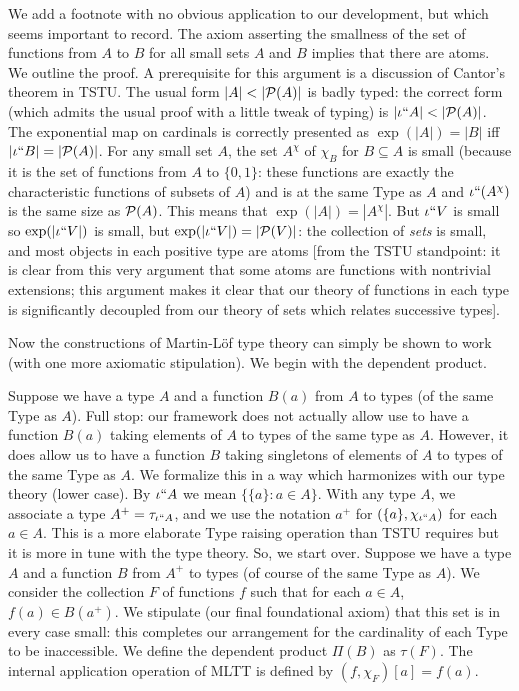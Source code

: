 \documentclass[12pt]{article}
\begin{document}
We add a footnote with no obvious application to our development, but which seems important to record.  The axiom asserting the smallness of the set of functions from $A$ to $B$ for all small sets $A$ and $B$ implies that there are atoms.  We outline the proof.   A prerequisite for this argument is a discussion of Cantor's theorem in TSTU.  The usual form $|A| < |{\cal P}(A)|$ is badly typed:  the correct form (which admits the usual proof with a little tweak of typing) is
$|\iota``A|<|{\cal P}(A)|$.  The exponential map on cardinals is correctly presented as $\exp(|A|)=|B|$ iff $|\iota``B|=|{\cal P}(A)|$.  For any small set $A$, the set $A^{\chi}$ of $\chi_B$ for $B\subseteq A$ is small (because it is the set of functions from $A$ to $\{0,1\}$:  these functions are exactly the characteristic functions of subsets of $A$) and is at the same 
Type as $A$ and $\iota``(A^\chi)$ is the same size as ${\cal P}(A)$.  This means that $\exp(|A|)= |A^\chi|$.  But $\iota``V$ is small so $\exp(|\iota``V|)$ is small, but $\exp(|\iota``V|) = |{\cal P}(V)|$:  the collection of {\em sets\/} is small, and most objects in each positive type are atoms [from the TSTU standpoint:  it is clear from this very argument
that some atoms are functions with nontrivial extensions;  this argument makes it clear that our theory of functions in each type is significantly decoupled from our theory of sets which relates successive types].

Now the constructions of Martin-L\"of type theory can simply be shown to work (with one more axiomatic stipulation).  We begin with the dependent product.

Suppose we have a type $A$ and a function $B(a)$ from $A$ to types (of the same Type as $A$).  Full stop:  our framework does not actually allow use to have a function $B(a)$ taking elements of $A$ to types of the same type as $A$. However, it
does allow us to have a function $B$ taking singletons of elements of $A$ to types of the same Type as $A$.  We formalize this in a way which harmonizes with our type theory (lower case).  By $\iota``A$ we mean $\{\{a\}:a \in A\}$.  With any type $A$,
we associate a type $A^+ = \tau_{\iota``A}$, and we use the notation $a^+$ for $(\{a\},\chi_{\iota``A})$ for each $a \in A$.  This is a more elaborate Type raising operation than TSTU requires but it is more in tune
with the type theory.  So, we start over.  Suppose we have a type $A$ and a function $B$ from $A^+$ to types (of course of the same Type as $A$).   We consider the collection $F$ of functions $f$ such that for each
$a \in A$, $f(a) \in B(a^+)$.  We stipulate (our final foundational axiom) that this set is in every case small:  this completes our arrangement for the cardinality of each Type to be inaccessible.  We define the dependent product $\Pi(B)$ as $\tau(F)$.   The internal application operation of MLTT is defined by $(f,\chi_F)[a] = f(a)$.
\end{document}
